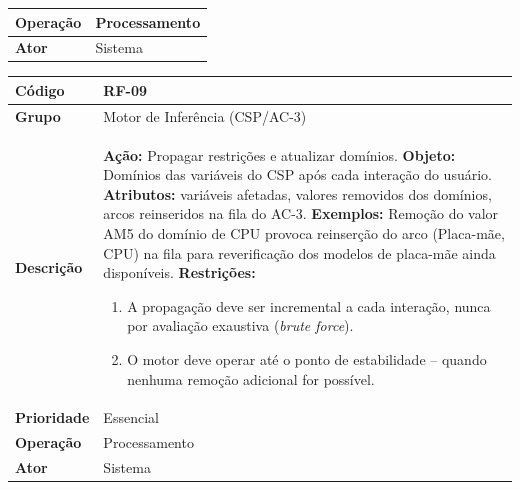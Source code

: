 \begin{quadro}[htb]
\begin{tabular}{|p{3.2cm}|p{11.8cm}|}
    \textbf{Operação}   & Processamento                                                                                                                                                                                    \\ \hline
    \textbf{Ator}       & Sistema                                                                                                                                                                                          \\ \hline
  \end{tabular}
\end{quadro}

\FloatBarrier
\begin{quadro}[htb]
  \caption{RF-09 -- Propagar restrições incrementalmente a cada seleção}
  \label{quad:rf09}
  \begin{tabular}{|p{3.2cm}|p{11.8cm}|}
    \hline
    \textbf{Código}     & RF-09                                                                                      \\ \hline
    \textbf{Grupo}      & Motor de Inferência (CSP/AC-3)                                                             \\ \hline
    \textbf{Descrição}  &
    \textbf{Ação:} Propagar restrições e atualizar domínios.
    \textbf{Objeto:} Domínios das variáveis do CSP após cada interação do usuário.
    \textbf{Atributos:} variáveis afetadas, valores removidos dos domínios, arcos reinseridos na fila do AC-3.
    \textbf{Exemplos:} Remoção do valor AM5 do domínio de CPU provoca reinserção do arco (Placa-mãe, CPU) na fila para reverificação dos modelos de placa-mãe ainda disponíveis.
    \textbf{Restrições:}
    \begin{enumerate}[nosep,leftmargin=1.2em,topsep=2pt,partopsep=0pt,parsep=0pt,itemsep=1pt]
      \item A propagação deve ser incremental a cada interação, nunca por avaliação exaustiva (\textit{brute force}).
      \item O motor deve operar até o ponto de estabilidade -- quando nenhuma remoção adicional for possível.
    \end{enumerate} \\ \hline
    \textbf{Prioridade} & Essencial                                                                                  \\ \hline
    \textbf{Operação}   & Processamento                                                                              \\ \hline
    \textbf{Ator}       & Sistema                                                                                    \\ \hline
  \end{tabular}
\end{quadro}

